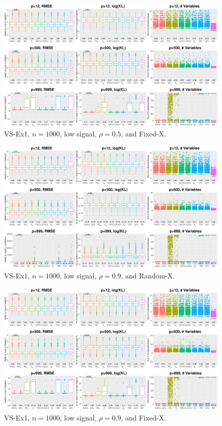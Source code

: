 \begin{figure}[!ht]
\centering
\includegraphics[width=\textwidth]{figures/supplement/fixedx_VS-Ex1_n1000_lsnr_rho05.eps}
\caption{VS-Ex1, $n=1000$, low signal, $\rho=0.5$, and Fixed-X.}
\end{figure}
\clearpage
\begin{figure}[!ht]
\centering
\includegraphics[width=\textwidth]{figures/supplement/randomx_VS-Ex1_n1000_lsnr_rho09.eps}
\caption{VS-Ex1, $n=1000$, low signal, $\rho=0.9$, and Random-X.}
\end{figure}
\begin{figure}[!ht]
\centering
\includegraphics[width=\textwidth]{figures/supplement/fixedx_VS-Ex1_n1000_lsnr_rho09.eps}
\caption{VS-Ex1, $n=1000$, low signal, $\rho=0.9$, and Fixed-X.}
\end{figure}
